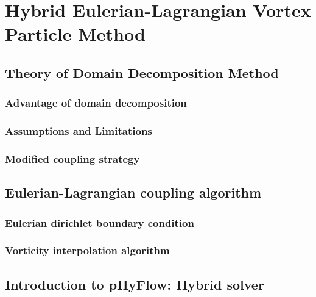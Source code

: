 \chapter{Hybrid Eulerian-Lagrangian Vortex Particle Method}

\section{Theory of Domain Decomposition Method}

\subsection{Advantage of domain decomposition}

\subsection{Assumptions and Limitations}

\subsection{Modified coupling strategy}

\section{Eulerian-Lagrangian coupling algorithm}

\subsection{Eulerian dirichlet boundary condition}

\subsection{Vorticity interpolation algorithm}

\section{Introduction to pHyFlow: Hybrid solver}

